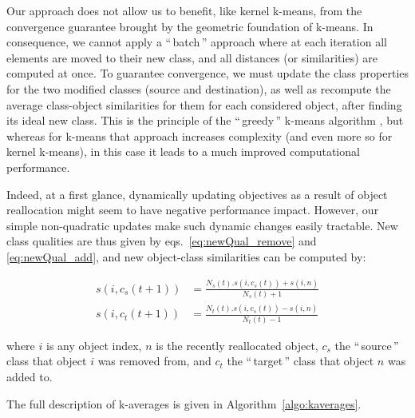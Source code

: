 \documentclass[10pt,letterpaper]{article}
\newcommand{\gl}[1]{``\,#1\,''} %
\begin{document}
Our approach does not allow us to benefit, like kernel k-means, from the convergence guarantee brought by the geometric foundation of k-means. In consequence, we cannot apply a \gl{batch} approach where at each iteration all elements are moved to their new class, and all distances (or similarities) are computed at once. To guarantee convergence, we must update the class properties for the two modified classes (source and destination), as well as recompute the average class-object similarities for them for each considered object, after finding its ideal new class. This is the principle of the \gl{greedy} k-means algorithm \cite[Chapter10.8]{Duda01}, but whereas for k-means that approach increases complexity (and even more so for kernel k-means), in this case it leads to a much improved computational performance.

Indeed, at a first glance, dynamically updating objectives as a result of object reallocation might seem to have negative performance impact. However, our simple non-quadratic updates make such dynamic changes easily tractable. New class qualities are thus given by eqs.~\ref{eq:newQual_remove} and \ref{eq:newQual_add}, and new object-class similarities can be computed by:


\begin{equation}
	\begin{aligned}
    s(i, c_s(t+1)) &= \frac{N_s(t).s(i, c_s(t)) + s(i,n)}{N_s(t)+1} \\
    s(i, c_t(t+1)) &= \frac{N_t(t).s(i, c_s(t)) - s(i,n)}{N_t(t)-1}
   	\end{aligned}
  \label{eq:newSimilNewC}
\end{equation}

\noindent where $i$ is any object index, $n$ is the recently reallocated object, $c_s$ the \gl{source} class that object $i$ was removed from, and $c_t$ the \gl{target} class that object $n$ was added to.

The full description of k-averages is given in Algorithm~\ref{algo:kaverages}.
\end{document}

